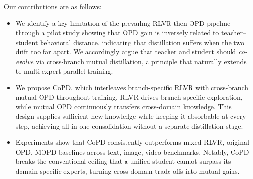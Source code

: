 Our contributions are as follows:
\begin{itemize}
    \item We identify a key limitation of the prevailing RLVR-then-OPD pipeline through a pilot study showing that OPD gain is inversely related to teacher--student behavioral distance, indicating that distillation suffers when the two drift too far apart. We accordingly argue that teacher and student should \textit{co-evolve} via cross-branch mutual distillation, a principle that naturally extends to multi-expert parallel training.
    \item We propose CoPD, which interleaves branch-specific RLVR with cross-branch mutual OPD throughout training. RLVR drives branch-specific exploration, while mutual OPD continuously transfers cross-domain knowledge. This design supplies sufficient new knowledge while keeping it absorbable at every step, achieving all-in-one consolidation without a separate distillation stage.
    \item Experiments show that CoPD consistently outperforms mixed RLVR, original OPD, MOPD baselines across text, image, video benchmarks. Notably, CoPD breaks the conventional ceiling that a unified student cannot surpass its domain-specific experts, turning cross-domain trade-offs into mutual gains.
\end{itemize}


